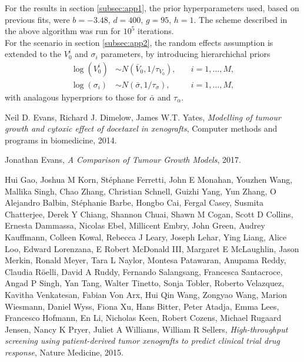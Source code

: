 \documentclass[11pt,a4paper]{article}
\begin{document}
For the results in section \ref{subsec:app1}, the prior hyperparameters used, based on previous fits, were $b = -3.48$, $d = 400$, $g = 95$, $h = 1$.
The scheme described in the above algorithm was run for $10^5$ iterations.
\\
For the scenario in section \ref{subsec:app2}, the random effects assumption is extended to the $V_0^i$ and $\sigma_i$ parameters, by introducing hierarchichal priors
\begin{align*}
\log(V_0^i) &\sim N(\bar{V}_0, 1/\tau_{V_0}), \quad &i = 1, \ldots, M, \\
\log(\sigma_i) &\sim N(\bar{\sigma}, 1/\tau_\sigma), \quad &i = 1, \ldots, M,
\end{align*}
with analagous hyperpriors to those for $\bar{\alpha}$ and $\tau_\alpha$.

\begin{thebibliography}{9}
Neil D. Evans, Richard J. Dimelow, James W.T. Yates,
\emph{Modelling of tumour growth and cytoxic effect of docetaxel in xenografts},
Computer methods and programs in biomedicine,
 2014.
 
Jonathan Evans,
\emph{A Comparison of Tumour Growth Models},
2017.

Hui Gao, Joshua M Korn, Stéphane Ferretti, John E Monahan, Youzhen Wang, Mallika Singh, Chao Zhang, Christian Schnell, Guizhi Yang, Yun Zhang, O Alejandro Balbin, Stéphanie Barbe, Hongbo Cai, Fergal Casey, Susmita Chatterjee, Derek Y Chiang, Shannon Chuai, Shawn M Cogan,
Scott D Collins, Ernesta Dammassa, Nicolas Ebel, Millicent Embry, John Green, Audrey Kauffmann, Colleen Kowal, Rebecca J Leary, Joseph Lehar, Ying Liang, Alice Loo, Edward Lorenzana, E Robert McDonald III, Margaret E McLaughlin, Jason Merkin, Ronald Meyer, Tara L Naylor,
Montesa Patawaran, Anupama Reddy, Claudia Röelli, David A Ruddy, Fernando Salangsang, Francesca Santacroce, Angad P Singh, Yan Tang, Walter Tinetto, Sonja Tobler, Roberto Velazquez, Kavitha Venkatesan, Fabian Von Arx, Hui Qin Wang, Zongyao Wang, Marion Wiesmann, Daniel Wyss, Fiona Xu, Hans Bitter, Peter Atadja, Emma Lees, Francesco Hofmann, En Li, Nicholas Keen, Robert Cozens, Michael Rugaard Jensen, Nancy K Pryer, Juliet A Williams, William R Sellers,
\emph{High-throughput screening using patient-derived tumor xenografts to predict clinical trial drug response},
Nature Medicine,
2015.

\end{thebibliography}
\end{document}

